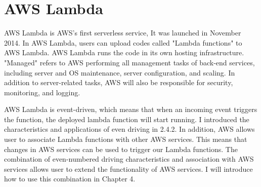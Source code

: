 \section{AWS Lambda}
AWS Lambda is AWS’s first serverless service,
It was launched in November 2014. In AWS Lambda, users can upload codes called "Lambda functions" to AWS Lambda. AWS Lambda runs the code in its own hosting infrastructure. "Managed" refers to AWS performing all management tasks of back-end services, including server and OS maintenance, server configuration, and scaling. In addition to server-related tasks, AWS will also be responsible for security, monitoring, and logging.
\par
AWS Lambda is event-driven, which means that when an incoming event triggers the function, the deployed lambda function will start running. I introduced the characteristics and applications of even driving in 2.4.2. In addition, AWS allows user to associate Lambda functions with other AWS services. This means that changes in AWS services can be used to trigger our Lambda functions. The combination of even-numbered driving characteristics and association with AWS services allows user to extend the functionality of AWS services. I will introduce how to use this combination in Chapter 4.
